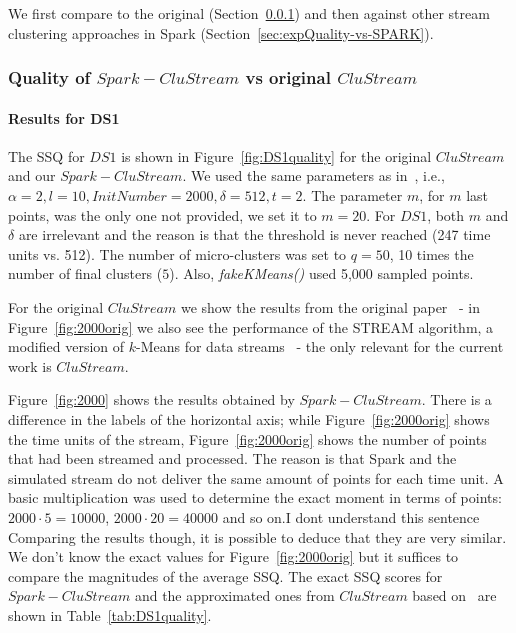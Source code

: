 We first compare \our to the original \clustream (Section~\ref{sec:expQuality-vs-CluStream}) and then against other stream clustering approaches in Spark (Section~\ref{sec:expQuality-vs-SPARK}).

\subsubsection{Quality of $Spark-CluStream$ vs original $CluStream$}
\label{sec:expQuality-vs-CluStream}
\paragraph{Results for DS1}
The SSQ for $DS1$ is shown in Figure~\ref{fig:DS1quality} for the original $CluStream$ and our $Spark-CluStream$.
We used the same parameters as in~\cite{clustreamOrig}, i.e., $\alpha=2,l=10,InitNumber=2000,\delta=512,t=2$.
The parameter $m$, for $m$ last points, was the only one not provided, we set it to $m=20$.
For $DS1$, both $m$ and $\delta$ are irrelevant and the reason is that the threshold is never reached (247 time units vs. 512). 
The number of micro-clusters was set to $q=50$, 10 times the number of final clusters ($5$). 
Also, \textit{fakeKMeans()} used 5,000 sampled points. 

For the original $CluStream$ we show the results from the original paper~\cite{clustreamOrig} - in Figure~\ref{fig:2000orig} we also see the performance of the STREAM algorithm, a modified version of $k$-Means for data 
streams~\cite{STREAM} - the only relevant for the current work is $CluStream$.

Figure~\ref{fig:2000} shows the results obtained by $Spark-CluStream$. There is a difference in the labels of the horizontal axis; while Figure~\ref{fig:2000orig} shows the time units of the stream, Figure~\ref{fig:2000orig} shows the number of points that had been streamed and processed. The reason is that Spark and the simulated stream  do not deliver the same amount of points for each time unit. %
A basic multiplication was used to determine the exact moment in terms of points: $2000\cdot 5 = 10000$, $2000\cdot 20 = 40000$ and so on.\color{red}I dont understand this sentence \color{black}
Comparing the results though, it is possible to deduce that they are very similar. We don't know the exact values for Figure~\ref{fig:2000orig} but it suffices to compare the magnitudes of the average SSQ. 
The exact SSQ scores for $Spark-CluStream$ and the approximated ones from $CluStream$ based on~\cite{CluStream} are shown in Table~\ref{tab:DS1quality}.

